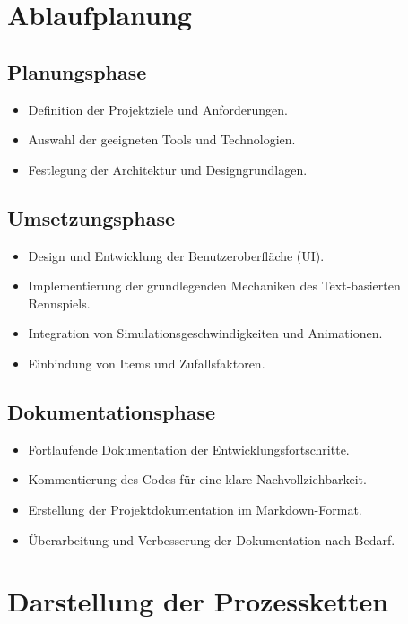 \documentclass[hidelinks,12pt]{article}
\begin{document}
\section{Ablaufplanung}

\subsection{Planungsphase}

\begin{itemize}
    \item Definition der Projektziele und Anforderungen.
    \item Auswahl der geeigneten Tools und Technologien.
    \item Festlegung der Architektur und Designgrundlagen.
\end{itemize}

\subsection{Umsetzungsphase}

\begin{itemize}
    \item Design und Entwicklung der Benutzeroberfläche (UI).
    \item Implementierung der grundlegenden Mechaniken des Text-basierten Rennspiels.
    \item Integration von Simulationsgeschwindigkeiten und Animationen.
    \item Einbindung von Items und Zufallsfaktoren.
\end{itemize}

\subsection{Dokumentationsphase}

\begin{itemize}
    \item Fortlaufende Dokumentation der Entwicklungsfortschritte.
    \item Kommentierung des Codes für eine klare Nachvollziehbarkeit.
    \item Erstellung der Projektdokumentation im Markdown-Format.
    \item Überarbeitung und Verbesserung der Dokumentation nach Bedarf.
\end{itemize}

\section{Darstellung der Prozessketten}
\end{document}
